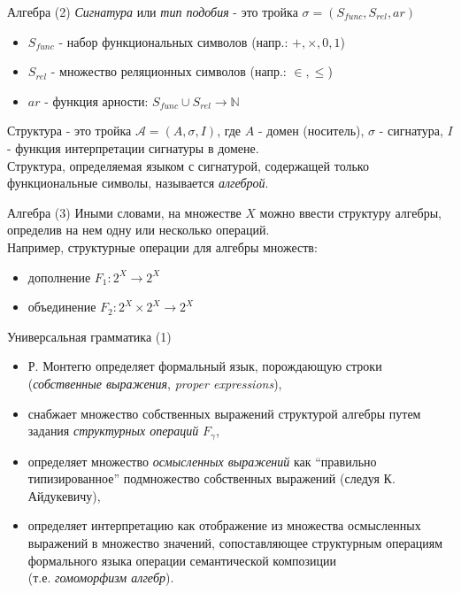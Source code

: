 \documentclass{beamer}
\begin{document}
\begin{frame}{Алгебра (2)}
\textit{Сигнатура} или \textit{тип подобия} - это тройка $\sigma = (S_{func}, S_{rel}, ar)$\\
\bigskip
\begin{itemize}
  \item $S_{func}$ - набор функциональных символов (напр.: $+, \times, 0, 1$)
  \item $S_{rel}$ - множество реляционных символов (напр.: $\in, \leq$)
  \item $ar$ - функция арности: $S_{func} \cup S_{rel} \to \mathbb{N}$
\end{itemize}
\bigskip
Структура - это тройка $\mathcal{A} = (A, \sigma, I)$, где $A$ - домен (носитель), $\sigma$ - сигнатура, $I$ - функция интерпретации сигнатуры в домене.\\
\bigskip
Структура, определяемая языком с сигнатурой, содержащей только функциональные символы, называется \textit{алгеброй}.
\end{frame}

\begin{frame}{Алгебра (3)}
Иными словами, на множестве $X$ можно ввести структуру алгебры, определив на нем одну или несколько операций.\\
\bigskip
Например, структурные операции для алгебры множеств:
\begin{itemize}
  \item дополнение $F_1 : 2^X \to 2^X$
  \item объединение $F_2 : 2^X \times 2^X \to 2^X$ 
\end{itemize}
\end{frame}

\begin{frame}{Универсальная грамматика (1)}
\begin{itemize}
  \item Р. Монтегю определяет формальный язык, порождающую строки (\textit{собственные выражения}, \textit{proper expressions}),
  \item снабжает множество собственных выражений структурой алгебры путем задания \textit{структурных операций} $F_\gamma$,
  \item определяет множество \textit{осмысленных выражений} как ``правильно типизированное'' подмножество собственных выражений (следуя К. Айдукевичу),
  \item определяет интерпретацию как отображение из множества осмысленных выражений в множество значений, сопоставляющее структурным операциям формального языка операции семантической композиции\\ (т.е. \textit{гомоморфизм алгебр}).
\end{itemize}
\end{frame}
\end{document}
